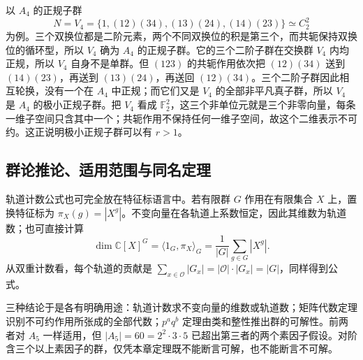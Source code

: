 以 \(A_4\) 的正规子群
\[
	N=V_4=\{1,(12)(34),(13)(24),(14)(23)\}\simeq C_2^2
\]
为例。三个双换位都是二阶元素，两个不同双换位的积是第三个，而共轭保持双换位的循环型，所以 \(V_4\) 确为 \(A_4\) 的正规子群。它的三个二阶子群在交换群 \(V_4\) 内均正规，所以 \(V_4\) 自身不是单群。但 \((123)\) 的共轭作用依次把 \((12)(34)\) 送到 \((14)(23)\)，再送到 \((13)(24)\)，再送回 \((12)(34)\)。三个二阶子群因此相互轮换，没有一个在 \(A_4\) 中正规；而它们又是 \(V_4\) 的全部非平凡真子群，所以 \(V_4\) 是 \(A_4\) 的极小正规子群。把 \(V_4\) 看成 \(\mathbb F_2^2\)，这三个非单位元就是三个非零向量，每条一维子空间只含其中一个；共轭作用不保持任何一维子空间，故这个二维表示不可约。这正说明极小正规子群可以有 \(r>1\)。

\subsection{群论推论、适用范围与同名定理}
\label{b5:subsec:0506:04}

轨道计数公式也可完全放在特征标语言中。若有限群 \(G\) 作用在有限集合 \(X\) 上，置换特征标为 \(\pi_X(g)=|X^g|\)。不变向量在各轨道上系数恒定，因此其维数为轨道数；也可直接计算
\[
	\dim\mathbb C[X]^G =\langle1_G,\pi_X\rangle_G =\frac1{|G|}\sum_{g\in G}|X^g|.
\]
从双重计数看，每个轨道的贡献是 \(\sum_{x\in\mathcal O}|G_x|=|\mathcal O|\cdot|G_x|=|G|\)，同样得到公式。

\ProseParagraphBreak
三种结论于是各有明确用途：轨道计数求不变向量的维数或轨道数；矩阵代数定理识别不可约作用所张成的全部代数；\(p^a q^b\) 定理由类和整性推出群的可解性。前两者对 \(A_5\) 一样适用，但 \(|A_5|=60=2^2\cdot3\cdot5\) 已超出第三者的两个素因子假设。对阶含三个以上素因子的群，仅凭本章定理既不能断言可解，也不能断言不可解。
